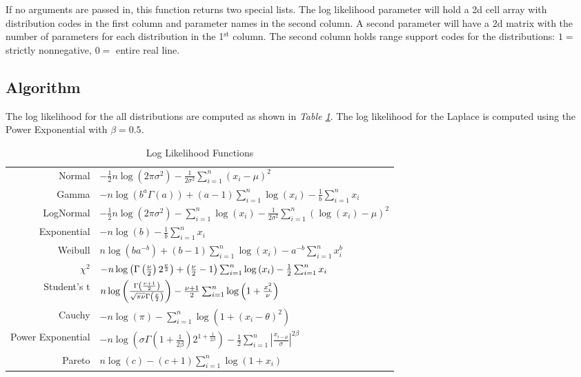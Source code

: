 \documentclass{book}
\newcommand{\textcode}[1]{\textsf{\small #1}}   %
\begin{document}
If no arguments are passed in, this function returns two special
lists. The \textcode{log likelihood} parameter will hold a 2d cell
array with distribution codes in the first column and parameter
names in the second column. A second parameter will have a 2d matrix
with the number of parameters for each distribution in the
1$^{\text{st}}$ column. The second column holds range support codes
for the distributions: $1=$ strictly nonnegative, $0=$ entire real
line.

\subsection*{Algorithm}

The log likelihood for the all distributions are computed as shown in \emph{%
Table \ref{tab_loglike}}. The log likelihood for the Laplace is
computed using the Power Exponential with $\beta =0.5$.
\begin{table}[htbp]
\begin{center}
\begin{tabular}{rl}
Normal & $-\frac{1}{2}n\log \left( 2\pi \sigma ^{2}\right) -\frac{1}{2\sigma
^{2}}\sum_{i=1}^{n}\left( x_{i}-\mu \right) ^{2}$ \\
Gamma & $-n\log \left( b^{a}\Gamma \left( a\right) \right) +\left(
a-1\right) \sum_{i=1}^{n}\log \left( x_{i}\right) -\frac{1}{b}%
\sum_{i=1}^{n}x_{i}$ \\
LogNormal & $-\frac{1}{2}n\log \left( 2\pi \sigma ^{2}\right)
-\sum_{i=1}^{n}\log \left( x_{i}\right) -\frac{1}{2\sigma ^{2}}%
\sum_{i=1}^{n}\left( \log \left( x_{i}\right) -\mu \right) ^{2}$ \\
Exponential & $-n\log \left( b\right) -\frac{1}{b}\sum_{i=1}^{n}x_{i}$ \\
Weibull & $n\log \left( ba^{-b}\right) +\left( b-1\right) \sum_{i=1}^{n}\log
\left( x_{i}\right) -a^{-b}\sum_{i=1}^{n}x_{i}^{b}$ \\
$\chi ^{2}$ & $-n\log \left( \Gamma \left( \frac{\nu }{2}\right) 2^{\frac{%
\nu }{2}}\right) +\left( \frac{\nu }{2}-1\right) \sum_{i=1}^{n}\log \left(
x_{i}\right) -\frac{1}{2}\sum_{i=1}^{n}x_{i}$ \\
Student's t & $n\log \left( \frac{\Gamma \left( \frac{\nu +1}{2}\right) }{%
\sqrt{\pi \nu }\Gamma \left( \frac{\nu }{2}\right) }\right) -\frac{\nu +1}{2}%
\sum_{i=1}^{n}\log \left( 1+\frac{x_{i}^{2}}{\nu }\right) $ \\
Cauchy & $-n\log \left( \pi \right) -\sum_{i=1}^{n}\log \left( 1+\left(
x_{i}-\theta \right) ^{2}\right) $ \\
Power Exponential & $-n\log \left( \sigma \Gamma \left( 1+\frac{1}{2\beta }%
\right) 2^{1+\frac{1}{2\beta }}\right) -\frac{1}{2}\sum_{i=1}^{n}\left\vert
\frac{x_{i-\mu }}{\sigma }\right\vert ^{2\beta }$ \\
Pareto & $n\log \left( c\right) -\left( c+1\right) \sum_{i=1}^{n}\log \left(
1+x_{i}\right) $%
\end{tabular}%
\end{center}
\caption{Log Likelihood Functions} \label{tab_loglike}
\end{table}
\end{document}
